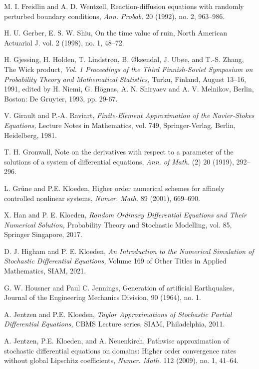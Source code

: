 \documentclass[reqno,12pt]{amsart}
\theoremstyle{plain} %
\theoremstyle{definition} %
\begin{document}
\begin{thebibliography}{25}
     M. I. Freidlin and A. D. Wentzell, Reaction-diffusion equations with randomly perturbed boundary conditions, \emph{Ann. Probab.} 20 (1992), no. 2, 963--986.

     H. U. Gerber, E. S. W. Shiu, On the time value of ruin, North American Actuarial J. 
    vol. 2 (1998), no. 1, 48--72.

     H. Gjessing, H. Holden, T. Lindstr{\o}n, B. {\O}ksendal, J. Ub{\o}e, and T.-S. Zhang, The Wick product, \emph{Vol. 1 Proceedings of the Third Finnish-Soviet Symposium on Probability Theory and Mathematical Statistics,} Turku, Finland, August 13--16, 1991, edited by H. Niemi, G. H\"ognas, A. N. Shiryaev and A. V. Melnikov, Berlin, Boston: De Gruyter, 1993, pp. 29-67.

     V. Girault and P.-A. Raviart, \emph{Finite-Element Approximation of the Navier-Stokes Equations,} Lecture Notes in Mathematics, vol. 749, Springer-Verlag, Berlin, Heidelberg, 1981.

     T. H. Gronwall, Note on the derivatives with respect to a parameter of the solutions of a system of differential equations, \emph{Ann. of Math.} (2) 20 (1919), 292--296.

     L. Gr\"une and P.E. Kloeden, Higher order numerical schemes for affinely controlled nonlinear systems, \emph{Numer. Math.} 89 (2001), 669--690.

     X. Han and P. E. Kloeden, \emph{Random Ordinary Differential Equations and Their Numerical Solution,} Probability Theory and Stochastic Modelling, vol. 85, Springer Singapore, 2017.

     D. J. Higham and P. E. Kloeden, \emph{An Introduction to the Numerical Simulation of Stochastic Differential Equations,} Volume 169 of Other Titles in Applied Mathematics, SIAM, 2021.

     G. W. Housner and Paul C. Jennings, Generation of artificial Earthquakes, Journal of the Engineering Mechanics Division, 90 (1964), no. 1.

     A. Jentzen and P.E. Kloeden, \emph{Taylor Approximations of Stochastic Partial Differential Equations,} CBMS Lecture series, SIAM, Philadelphia, 2011.

     A. Jentzen, P.E. Kloeden, and A. Neuenkirch, Pathwise approximation of stochastic differential equations on domains: Higher order convergence rates without global Lipschitz coefficients, \emph{Numer. Math.} 112 (2009), no. 1, 41--64.


\end{thebibliography}
\end{document}
